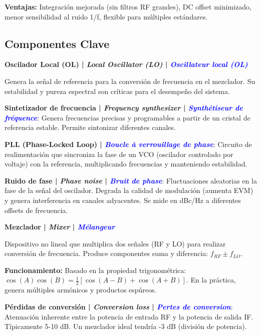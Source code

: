 \documentclass[a4paper,10pt]{article}
\begin{document}
\textbf{Ventajas:} Integraci\'on mejorada (sin filtros RF grandes), DC offset minimizado, menor sensibilidad al ruido 1/f, flexible para m\'ultiples est\'andares.

\subsection{Componentes Clave}

\textbf{Oscilador Local (OL) | \textit{Local Oscillator (LO)} | \textcolor{blue}{\textit{Oscillateur local (OL)}}}

Genera la se\~nal de referencia para la conversi\'on de frecuencia en el mezclador. Su estabilidad y pureza espectral son cr\'iticas para el desempe\~no del sistema.

\textbf{Sintetizador de frecuencia | \textit{Frequency synthesizer} | \textcolor{blue}{\textit{Synth\'etiseur de fr\'equence}}}: Genera frecuencias precisas y programables a partir de un cristal de referencia estable. Permite sintonizar diferentes canales.

\textbf{PLL (Phase-Locked Loop) | \textcolor{blue}{\textit{Boucle \`a verrouillage de phase}}}: Circuito de realimentaci\'on que sincroniza la fase de un VCO (oscilador controlado por voltaje) con la referencia, multiplicando frecuencias y manteniendo estabilidad.

\textbf{Ruido de fase | \textit{Phase noise} | \textcolor{blue}{\textit{Bruit de phase}}}: Fluctuaciones aleatorias en la fase de la se\~nal del oscilador. Degrada la calidad de modulaci\'on (aumenta EVM) y genera interferencia en canales adyacentes. Se mide en dBc/Hz a diferentes offsets de frecuencia.

\textbf{Mezclador | \textit{Mixer} | \textcolor{blue}{\textit{M\'elangeur}}}

Dispositivo no lineal que multiplica dos se\~nales (RF y LO) para realizar conversi\'on de frecuencia. Produce componentes suma y diferencia: $f_{RF} \pm f_{LO}$.

\textbf{Funcionamiento:} Basado en la propiedad trigonom\'etrica: $\cos(A)\cos(B) = \frac{1}{2}[\cos(A-B) + \cos(A+B)]$. En la pr\'actica, genera m\'ultiples arm\'onicos y productos esp\'ureos.

\textbf{P\'erdidas de conversi\'on | \textit{Conversion loss} | \textcolor{blue}{\textit{Pertes de conversion}}}: Atenuaci\'on inherente entre la potencia de entrada RF y la potencia de salida IF. T\'ipicamente 5-10 dB. Un mezclador ideal tendr\'ia -3 dB (divisi\'on de potencia).
\end{document}
